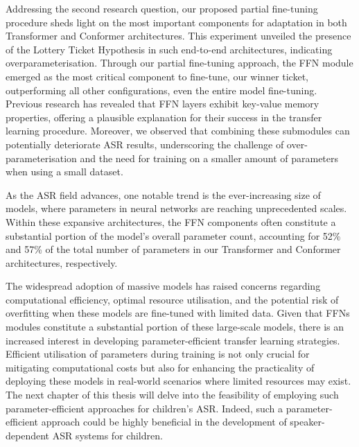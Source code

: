 Addressing the second research question, our proposed partial fine-tuning procedure sheds light on the most important components for adaptation in both Transformer and Conformer architectures. This experiment unveiled the presence of the Lottery Ticket Hypothesis in such end-to-end architectures, indicating overparameterisation. Through our partial fine-tuning approach, the \ac{FFN} module emerged as the most critical component to fine-tune, our winner ticket, outperforming all other configurations, even the entire model fine-tuning. Previous research \cite{geva2020transformer} has revealed that \ac{FFN} layers exhibit key-value memory properties, offering a plausible explanation for their success in the transfer learning procedure. Moreover, we observed that combining these submodules can potentially deteriorate \ac{ASR} results, underscoring the challenge of over-parameterisation and the need for training on a smaller amount of parameters when using a small dataset. 

As the \ac{ASR} field advances, one notable trend is the ever-increasing size of models, where parameters in neural networks are reaching unprecedented scales. 
Within these expansive architectures, the \ac{FFN} components often constitute a substantial portion of the model's overall parameter count, accounting for 52\% and 57\% of the total number of parameters in our Transformer and Conformer architectures, respectively.

The widespread adoption of massive models has raised concerns regarding computational efficiency, optimal resource utilisation, and the potential risk of overfitting when these models are fine-tuned with limited data. Given that \ac{FFN}s modules constitute a substantial portion of these large-scale models, there is an increased interest in developing parameter-efficient transfer learning strategies. Efficient utilisation of parameters during training is not only crucial for mitigating computational costs but also for enhancing the practicality of deploying these models in real-world scenarios where limited resources may exist.
The next chapter of this thesis will delve into the feasibility of employing such parameter-efficient approaches for children's \ac{ASR}. Indeed, such a parameter-efficient approach could be highly beneficial in the development of speaker-dependent \ac{ASR} systems for children. 